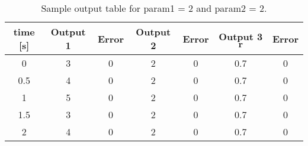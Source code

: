 \begin{table}[htbp]
\caption{Sample output table for param1 = 2 and param2 = 2.}
\label{tbl:test22}
\centering
\begin{tabular}{ccccccc}
\hline
  time [s]  &  Output 1  &  Error  &  Output 2  &  Error  &  Output 3 $\bm r$  &  Error  \\
\hline
     0      &     3      &    0    &     2      &    0    &        0.7         &    0    \\
    0.5     &     4      &    0    &     2      &    0    &        0.7         &    0    \\
     1      &     5      &    0    &     2      &    0    &        0.7         &    0    \\
    1.5     &     3      &    0    &     2      &    0    &        0.7         &    0    \\
     2      &     4      &    0    &     2      &    0    &        0.7         &    0    \\
\hline
\end{tabular}\end{table}